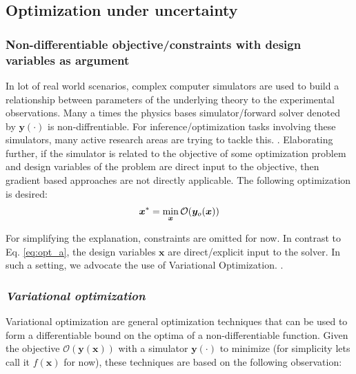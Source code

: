 \clearpage

\subsection{Optimization under uncertainty}






\subsubsection{Non-differentiable objective/constraints with design variables as argument}
%
In lot of real world scenarios, complex computer simulators are used to build a relationship between parameters of the underlying theory to the experimental observations. Many a times the physics bases simulator/forward solver denoted by $\bm{y}(\cdot)$ is non-diffrentiable. For inference/optimization tasks involving these simulators, many active research areas are trying to tackle this. \cite{cranmer2020frontier, louppe_adversarial_2019, beaumont2002approximate,marjoram2003markov}. Elaborating further, if the simulator is related to the objective of some optimization problem and design variables of the problem are direct input to the objective, then gradient based approaches are not directly applicable. The following optimization is desired:
\begin{align}
	\bm{x}^* = \min_{\bm{x}}\mathcal{O}(\boldsymbol{y}_o(\bm{x}))
\end{align}

For simplifying the explanation, constraints are omitted for now. In contrast to Eq. \ref{eq:opt_a}, the design variables $\bm{x}$ are direct/explicit input to the solver. In such a setting, we advocate the use of Variational Optimization. \cite{bird_stochastic_2018,staines_variational_2012,staines2013optimization}. 

\subsubsection{\emph{Variational optimization}}

Variational optimization are general optimization techniques that can be used to form a differentiable bound on the optima of a non-differentiable function. Given the objective $\mathcal{O}(\bm{y}(\bm{x}))$ with a simulator $\bm{y}(\cdot)$ to minimize (for simplicity lets call it $f(\bm{x})$ for now), these techniques are based on the following observation:

